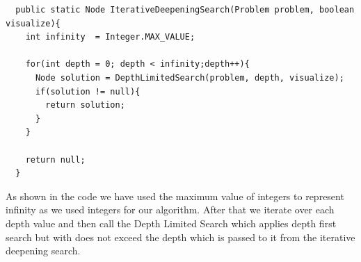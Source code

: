 \documentclass{article}
\begin{document}
\begin{verbatim}
  public static Node IterativeDeepeningSearch(Problem problem, boolean visualize){
    int infinity  = Integer.MAX_VALUE;

    for(int depth = 0; depth < infinity;depth++){
      Node solution = DepthLimitedSearch(problem, depth, visualize);
      if(solution != null){
        return solution;
      }
    }

    return null;
  }
\end{verbatim}

As shown in the code we have used the maximum value of integers to represent infinity as we used integers for our algorithm. After that we iterate over each depth value and then call the Depth Limited Search which applies depth first search but with does not exceed the depth which is passed to it from the iterative deepening search.
\end{document}
